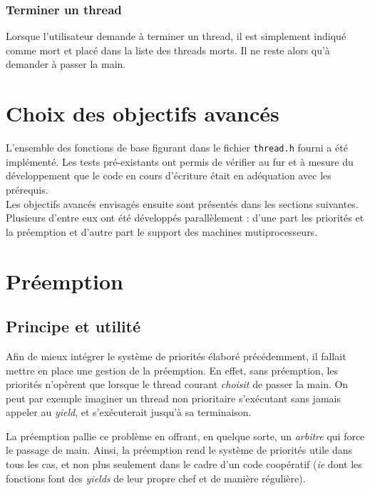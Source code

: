 \documentclass[a4paper,11pt]{article}
\begin{document}
\subsubsection*{Terminer un thread}

Lorsque l'utilisateur demande à terminer un thread, il est simplement indiqué comme mort et placé dans la liste des threads morts. Il ne reste alors qu'à demander à passer la main.





\section{Choix des objectifs avancés}

L’ensemble des fonctions de base figurant dans le fichier \texttt{thread.h} fourni a été implémenté. Les tests pré-existants ont permis de vérifier au fur et à mesure du développement que le code en cours
d’écriture était en adéquation avec les prérequis.\\

Les objectifs avancés envisagés ensuite sont présentés dans les sections suivantes. Plusieurs d'entre eux ont été développés parallèlement : d'une part les priorités et la préemption et d'autre part le support des machines mutiprocesseurs.

\section{Préemption}

\subsection{Principe et utilité}

Afin de mieux intégrer le système de priorités élaboré précédemment, il fallait mettre en place une gestion de la préemption. En effet, sans préemption, les priorités n'opèrent que lorsque le thread courant \textit{choisit} de passer la main. On peut par exemple imaginer un thread non prioritaire s'exécutant sans jamais appeler au \textit{yield}, et s'exécuterait jusqu'à sa terminaison.

La préemption pallie ce problème en offrant, en quelque sorte, un \textit{arbitre} qui force le passage de main. Ainsi, la préemption rend le système de priorités utile dans tous les cas, et non plus seulement dans le cadre d'un code coopératif (\textit{ie} dont les fonctions font des \textit{yields} de leur propre chef et de manière régulière).
\end{document}
